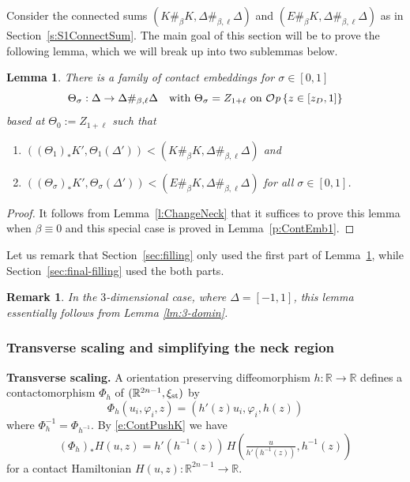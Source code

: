 \documentclass[12pt]{paper}
\theoremstyle{plain}
\newtheorem{lemma}[theorem]{Lemma}
\newtheorem{remark}[theorem]{Remark}
\theoremstyle{definition}
\newcommand{\wt}{\widetilde}
\newcommand{\p}{\partial}
\newcommand{\R}{{\mathbb{R}}}
\newcommand{\st}{{\rm st}}
\def\Op{{\mathcal O}{\it p}\,}
\numberwithin{figure}{section}
\begin{document}
Consider the connected sums $(K\#_\beta K, \Delta\#_{\beta, \ell}\Delta)$ and
$(E\#_\beta K, \Delta\#_{\beta, \ell}\Delta)$ as in Section~\ref{s:S1ConnectSum}.
The main goal of this section will be to prove the following lemma, which we will break up into two sublemmas below.
  
\begin{lemma}\label{p:ContEmb}
	There is a family of contact embeddings for $\sigma\in[0,1]$
	$$
		\Theta_\sigma: \Delta \to \Delta\#_{\beta, \ell}\Delta \quad\mbox{with
		$\Theta_\sigma = Z_{1+\ell}$ on $\Op\{z \in [z_D, 1]\}$}
	$$
	based at $\Theta_0 := Z_{1+\ell}$ such that
	\begin{enumerate}
	\item $\left((\Theta_1)_*K' ,\Theta_1(\Delta')\right) < \left(K\#_\beta K, \Delta\#_{\beta, \ell}\Delta\right)$ and
	\item $\left((\Theta_\sigma)_*K',\Theta_\sigma(\Delta')\right) < \left(E\#_\beta K, \Delta\#_{\beta, \ell}\Delta\right)$ for all $\sigma \in [0,1]$.
	\end{enumerate}
\end{lemma}
\begin{proof}
	It follows from Lemma~\ref{l:ChangeNeck} that it suffices to prove this lemma when $\beta \equiv 0$
	and this special case is proved in Lemma~\ref{p:ContEmb1}.
\end{proof}

Let us remark that Section~\ref{sec:filling} only used the first part of Lemma~\ref{p:ContEmb}, while 
Section~\ref{sec:final-filling} used the both parts.

\begin{remark} In the $3$-dimensional case, where $\Delta = [-1,1]$,
this lemma essentially follows from Lemma \ref{lm:3-domin}.
\end{remark}

\subsubsection{Transverse scaling and simplifying the neck region}%

\textbf{Transverse scaling.}
	A orientation preserving diffeomorphism $h: \R \to \R$ defines a contactomorphism
	$\Phi_h$ of $(\R^{2n-1}, \xi_\st)$ by
	$$
		\Phi_h(u_i, \varphi_i, z) = (h'(z)u_i, \varphi_i, h(z)) 
	$$
	where $\Phi_{h}^{-1} = \Phi_{h^{-1}}$.  
	By \eqref{e:ContPushK} we have 
	\begin{equation}\label{e:PushS}
		(\Phi_{h})_{*}H(u,z) = h'(h^{-1}(z))\, H(\tfrac{u}{h'(h^{-1}(z))}, h^{-1}(z))
	\end{equation}
	for a contact Hamiltonian $H(u,z) : \R^{2n-1} \to \R$.
\end{document}
